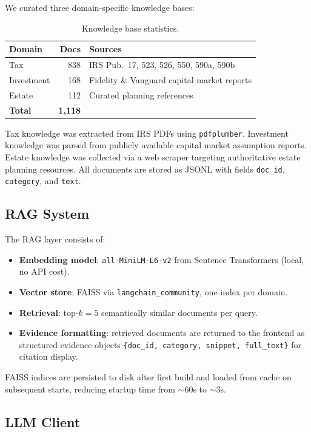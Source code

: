 \documentclass[sigplan,screen]{acmart}
\begin{document}
We curated three domain-specific knowledge bases:

\begin{table}[h]
\caption{Knowledge base statistics.}
\label{tab:kb}
\begin{tabular}{lrp{3.8cm}}
\toprule
Domain & Docs & Sources \\
\midrule
Tax & 838 & IRS Pub.\ 17, 523, 526, 550, 590a, 590b \\
Investment & 168 & Fidelity \& Vanguard capital market reports \\
Estate & 112 & Curated planning references \\
\midrule
\textbf{Total} & \textbf{1{,}118} & \\
\bottomrule
\end{tabular}
\end{table}

Tax knowledge was extracted from IRS PDFs using \texttt{pdfplumber}.
Investment knowledge was parsed from publicly available capital market assumption reports.
Estate knowledge was collected via a web scraper targeting authoritative estate planning resources.
All documents are stored as JSONL with fields \texttt{doc\_id}, \texttt{category}, and \texttt{text}.

\subsection{RAG System}

The RAG layer consists of:
\begin{itemize}
  \item \textbf{Embedding model}: \texttt{all-MiniLM-L6-v2} from Sentence Transformers (local, no API cost).
  \item \textbf{Vector store}: FAISS via \texttt{langchain\_community}, one index per domain.
  \item \textbf{Retrieval}: top-$k=5$ semantically similar documents per query.
  \item \textbf{Evidence formatting}: retrieved documents are returned to the frontend as structured evidence objects \texttt{\{doc\_id, category, snippet, full\_text\}} for citation display.
\end{itemize}

FAISS indices are persisted to disk after first build and loaded from cache on subsequent starts, reducing startup time from $\sim$60s to $\sim$3s.

\subsection{LLM Client}
\end{document}
